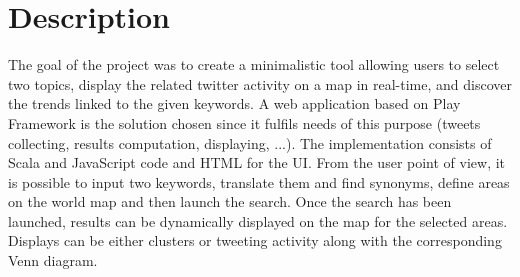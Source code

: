 \section{Description}

The goal of the project was to create a minimalistic tool allowing users to select two topics, display the related twitter activity on a map in real-time, and discover the trends linked to the given keywords. 
A web application based on Play Framework \cite{play} is the solution chosen since it fulfils needs of this purpose (tweets collecting, results computation, displaying, ...). The implementation consists of Scala and JavaScript code and HTML for the UI.
From the user point of view, it is possible to input two keywords, translate them and find synonyms, define areas on the world map and then launch the search. Once the search has been launched, results can be dynamically displayed on the map for the selected areas. Displays can be either clusters or tweeting activity along with the corresponding Venn diagram.

